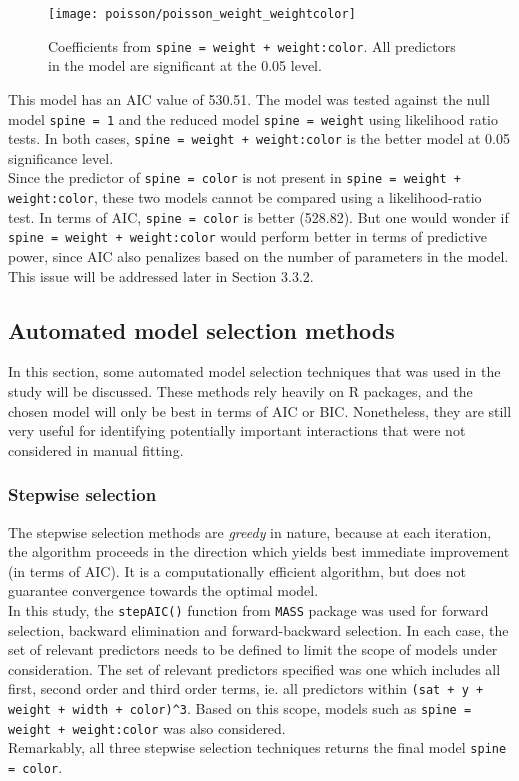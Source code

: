 \documentclass[a4paper, 12pt]{article}
\begin{document}
\begin{figure}[H]
    \centering
    \texttt{[image: poisson/poisson\_weight\_weightcolor]} 
    \caption{Coefficients from \texttt{spine = weight + weight:color}. All predictors in the model are significant at the 0.05 level.}
    \label{poisson-with-interactions}
\end{figure}

\noindent This model has an AIC value of 530.51. The model was tested against the null model \texttt{spine = 1} and the reduced model \texttt{spine = weight} using likelihood ratio tests. In both cases, \texttt{spine = weight + weight:color} is the better model at 0.05 significance level. \\
\indent Since the predictor of \texttt{spine = color} is not present in \texttt{spine = weight + weight:color}, these two models cannot be compared using a likelihood-ratio test. In terms of AIC, \texttt{spine = color} is better (528.82). But one would wonder if \texttt{spine = weight + weight:color} would perform better in terms of predictive power, since AIC also penalizes based on the number of parameters in the model. This issue will be addressed later in Section 3.3.2. 

\subsection{Automated model selection methods}
\noindent In this section, some automated model selection techniques that was used in the study will be discussed. These methods rely heavily on R packages, and the chosen model will only be best in terms of AIC or BIC. Nonetheless, they are still very useful for identifying potentially important interactions that were not considered in manual fitting. 

\subsubsection{Stepwise selection}
The stepwise selection methods are \textit{greedy} in nature, because at each iteration, the algorithm proceeds in the direction which yields best immediate improvement (in terms of AIC). It is a computationally efficient algorithm, but does not guarantee convergence towards the optimal model. \\
\indent In this study, the \texttt{stepAIC()} function from \texttt{MASS} package was used for forward selection, backward elimination and forward-backward selection. In each case, the set of relevant predictors needs to be defined to limit the scope of models under consideration. The set of relevant predictors specified was one which includes all first, second order and third order terms, ie. all predictors within \texttt{(sat + y + weight + width + color)\textasciicircum3}. Based on this scope, models such as \texttt{spine = weight + weight:color} was also considered. \\
\indent Remarkably, all three stepwise selection techniques returns the final model \texttt{spine = color}.
\end{document}
